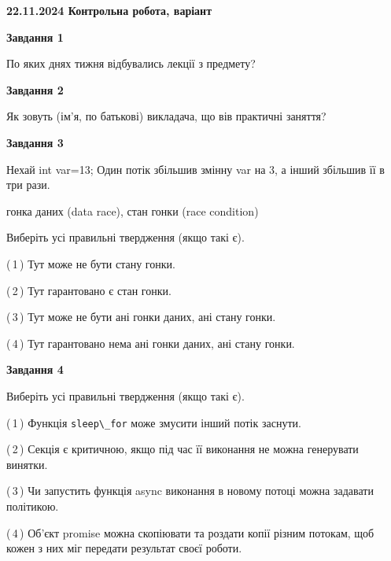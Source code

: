\documentclass[12pt, ukrainian]{article}
\def\code#1{\Verb!#1!}
\begin{document}
\begin {large}

\textbf{22.11.2024 Контрольна робота, варіант  }\par


{

\begin{center}
\textbf{Завдання 1}
\end{center}

По яких днях тижня відбувались лекції з предмету?


\begin{center}
\textbf{Завдання 2}
\end{center}

Як зовуть (ім'я, по батькові) викладача, що вів практичні заняття?


\begin{center}
\textbf{Завдання 3}
\end{center}

Нехай int var=13; Один потік збільшив змінну var на 3, а інший збільшив її в три рази.

гонка даних (data race), стан гонки (race condition)

Виберіть усі правильні твердження (якщо такі є).\par
\vspace{2mm}
(\,1\,) Тут може не бути стану гонки.%

(\,2\,) Тут гарантовано є стан гонки.%

(\,3\,) Тут може не бути ані гонки даних, ані стану гонки.%

(\,4\,) Тут гарантовано нема ані гонки даних, ані стану гонки.%


\begin{center}
\textbf{Завдання 4}
\end{center}

Виберіть усі правильні твердження (якщо такі є).\par
\vspace{2mm}

(\,1\,) Функція \code{sleep\_for} може змусити інший потік заснути.%

(\,2\,) Секція є критичною, якщо під час її виконання не можна генерувати винятки.%

(\,3\,) Чи запустить функція  async виконання в новому потоці можна задавати політикою.%

(\,4\,) Об’єкт promise можна скопіювати та роздати копії різним потокам, щоб кожен з них міг передати результат своєї роботи.%


}
\end{large}
\end{document}
